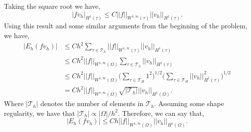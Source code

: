\documentclass[11pt]{article}
\begin{document}
Taking the square root we have,
\begin{equation*}
    |f v_h|_{H^1(\tau)} \leq C ||f||_{W^{1,\infty}(\tau)} ||v_h||_{H^1(\tau)}.
\end{equation*}
Using this result and some similar arguments from the beginning of the problem, we have,
\begin{align*}
    |E_h(f v_h)| &\leq Ch^2 \sum_{\tau \in \mathcal{T}_h} ||f||_{W^{1,\infty}(\tau)} ||v_h||_{H^1(\tau)} \\
    &\leq Ch^2 ||f||_{W^{1,\infty}(\Omega)} \sum_{\tau \in \mathcal{T}_h} ||v_h||_{H^1(\tau)} \\
    &\leq Ch^2 ||f||_{W^{1,\infty}(\Omega)} \Big( \sum_{\tau \in \mathcal{T}_H} 1^2 \Big)^{1/2} \Big( \sum_{\tau \in \mathcal{T}_H} ||v_h||^2_{H^1(\tau)} \Big)^{1/2} \\
    &= Ch^2 ||f||_{W^{1,\infty}(\Omega)} \sqrt{|\mathcal{T}_h|} ||v_h||_{H^1(\Omega)}.
\end{align*}
Where $|\mathcal{T}_h|$ denotes the number of elements in $\mathcal{T}_h$.
Assuming some shape regularity, we have that $|\mathcal{T}_h| \propto |\Omega|/h^2$. 
Therefore, we can say that,
\begin{equation}
    |E_h(f v_h)| \leq Ch ||f||_{W^{1,\infty}(\Omega)}||v_h||_{H^1(\Omega)}. 
\end{equation}
\end{document}
